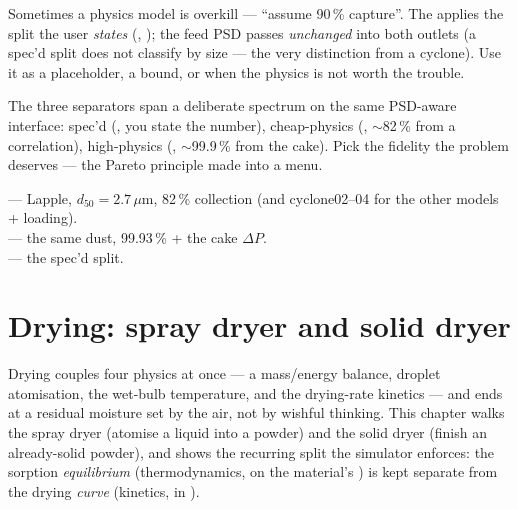 \documentclass[11pt,a4paper]{article}
\begin{document}
Sometimes a physics model is overkill --- ``assume 90\,\% capture''.
The  applies the split the user \emph{states}
(, ); the feed PSD passes
\emph{unchanged} into both outlets (a spec'd split does not classify by
size --- the very distinction from a cyclone).  Use it as a placeholder,
a bound, or when the physics is not worth the trouble.

\begin{keyidea}
The three separators span a deliberate spectrum on the same PSD-aware
interface: spec'd (, you state the number),
cheap-physics (, $\sim$82\,\% from a correlation),
high-physics (, $\sim$99.9\,\% from the cake).  Pick the
fidelity the problem deserves --- the Pareto principle made into a
menu.
\end{keyidea}

\begin{tutoriallink}
 --- Lapple, $d_{50}=2.7\,\mu$m,
82\,\% collection (and cyclone02--04 for the other models + loading). \\
 --- the same dust, 99.93\,\% +
the cake $\Delta P$. \\
 --- the spec'd split.
\end{tutoriallink}

\section{Drying: spray dryer and solid dryer}\label{ch:drying}

\begin{whatyoulllearn}
Drying couples four physics at once --- a mass/energy balance, droplet
atomisation, the wet-bulb temperature, and the drying-rate kinetics ---
and ends at a residual moisture set by the air, not by wishful thinking.
This chapter walks the spray dryer (atomise a liquid into a powder) and
the solid dryer (finish an already-solid powder), and shows the
recurring split the simulator enforces: the sorption \emph{equilibrium}
(thermodynamics, on the material's ) is kept separate from
the drying \emph{curve} (kinetics, in ).
\end{whatyoulllearn}
\end{document}
